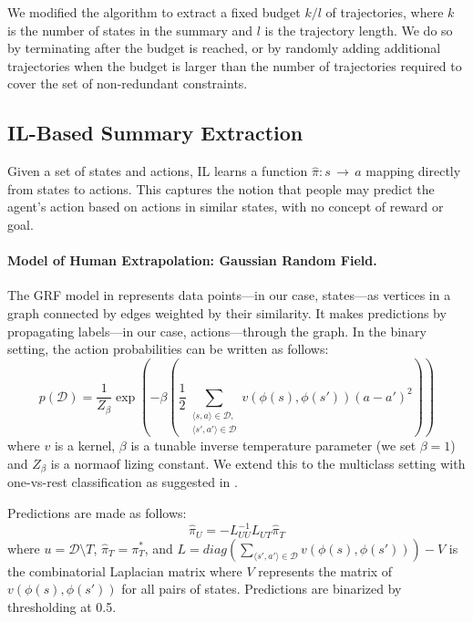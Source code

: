 \documentclass{article}
\begin{document}
We modified the algorithm to extract a fixed budget $k/l$ of trajectories, where $k$ is the number of states in the summary and $l$ is the trajectory length. We do so by terminating after the budget is reached, or by randomly adding additional trajectories when the budget is larger than the number of trajectories required to cover the set of non-redundant constraints.

\subsection{IL-Based Summary Extraction}
Given a set of states and actions, IL learns a function $\hat{\pi}: s\,\to\,a$ mapping directly from states to actions. This captures the notion that people may predict the agent's action based on actions in similar states, with no concept of reward or goal. 

\paragraph{Model of Human Extrapolation: Gaussian Random Field.}

The GRF model in \cite{zhu2003} represents data points---in our case, states---as vertices in a graph connected by edges weighted by their similarity. It makes predictions by propagating labels---in our case, actions---through the graph. In the binary setting, the action probabilities can be written as follows:
\begin{equation}\label{eq_energy}
p(\mathcal{D}) = \frac{1}{Z_\beta}\exp(-\beta (\frac{1}{2} \sum_{\substack{\langle s , a \rangle \in \mathcal{D}, \\ \langle s' , a' \rangle \in \mathcal{D}}} v(\phi(s), \phi(s')) (a - a')^2))
\end{equation}
 where $v$ is a kernel, $\beta$ is a tunable inverse temperature parameter (we set $\beta=1$) and $Z_\beta$ is a normaof lizing constant. We extend this to the multiclass setting with one-vs-rest classification as suggested in \cite{zhu2003semisupervised}. 

Predictions are made as follows: 
\begin{equation}\label{eq_GRFmean}
\hat{\pi}_U = - L_{UU}^{-1} L_{UT} \hat{\pi}_T
\end{equation}
where $u = \mathcal{D} \setminus T$, $\hat{\pi}_T = \pi^*_T$, and $L = diag(\sum_{\langle s' , a' \rangle \in \mathcal{D}} v(\phi(s), \phi(s'))) - V$ is the combinatorial Laplacian matrix where $V$ represents the matrix of $v(\phi(s), \phi(s'))$ for all pairs of states. Predictions are binarized by thresholding at 0.5.
\end{document}
